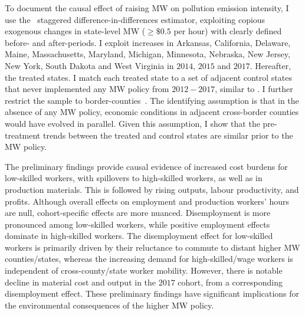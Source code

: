 \documentclass[authoryear, preprint, twocolumn, 1p]{elsarticle}
\begin{document}
    To document the causal effect of raising MW on pollution emission intensity, I use the~\citet{sun2021estimating} staggered difference-in-differences estimator, exploiting copious exogenous changes in state-level MW ($\geq \$0.5$ per hour) with clearly defined before- and after-periods. I exploit increases in Arkansas, California, Delaware, Maine, Massachusetts, Maryland, Michigan, Minnesota, Nebraska, New Jersey, New York, South Dakota and West Virginia in $2014$, $2015$ and $2017$. Hereafter, the treated states. I match each treated state to a set of adjacent control states that never implemented any MW policy from $2012-2017$, similar to \citet{gopalan2021state}. I further restrict the sample to border-counties~\citep{dube2010minimum}. The identifying assumption is that in the absence of any MW policy, economic conditions in adjacent cross-border counties would have evolved in parallel. Given this assumption, I show that the pre-treatment trends between the treated and control states are similar prior to the MW policy.

    The preliminary findings provide causal evidence of increased cost burdens for low-skilled workers, with spillovers to high-skilled workers, as well as in production materials. This is followed by rising outputs, labour productivity, and profits. Although overall effects on employment and production workers' hours are null, cohort-specific effects are more nuanced. Disemployment is more pronounced among low-skilled workers, while positive employment effects dominate in high-skilled workers. The disemployment effect for low-skilled workers is primarily driven by their reluctance to commute to distant higher MW counties/states, whereas the increasing demand for high-skilled/wage workers is independent of cross-county/state worker mobility. However, there is notable decline in material cost and output in the $2017$ cohort, from a corresponding disemployment effect. These preliminary findings have significant implications for the environmental consequences of the higher MW policy.
\end{document}
